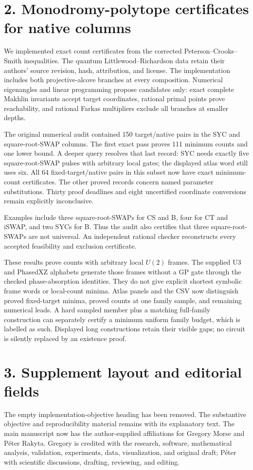 \documentclass[11pt]{article}
\begin{document}
\section*{2. Monodromy-polytope certificates for native columns}
We implemented exact count certificates from the corrected
Peterson--Crooks--Smith inequalities. The quantum Littlewood--Richardson
data retain their authors' source revision, hash, attribution, and license.
The implementation includes both projective-alcove branches at every
composition. Numerical eigenangles and linear programming propose candidates
only: exact complete Makhlin invariants accept target coordinates, rational
primal points prove reachability, and rational Farkas multipliers exclude
all branches at smaller depths.

The original numerical audit contained 150 target/native pairs in the SYC
and square-root-SWAP columns. The first exact pass proves 111 minimum
counts and one lower bound. A deeper query resolves that last record:
SYC needs exactly five square-root-SWAP pulses with arbitrary local gates;
the displayed atlas word still uses six. All 64 fixed-target/native pairs
in this subset now have exact minimum-count certificates. The other proved
records concern named parameter substitutions. Thirty proof deadlines and
eight uncertified coordinate conversions remain explicitly inconclusive.

Examples include three square-root-SWAPs for CS and B, four for CT and
iSWAP, and two SYCs for B. Thus the audit also certifies that three
square-root-SWAPs are not universal. An independent rational checker
reconstructs every accepted feasibility and exclusion certificate.

These results prove counts with arbitrary local $U(2)$ frames. The supplied
U3 and PhasedXZ alphabets generate those frames without a GP gate through
the checked phase-absorption identities. They do not give explicit shortest
symbolic frame words or local-count minima. Atlas panels and the CSV now
distinguish proved fixed-target minima, proved counts at one family sample,
and remaining numerical leads. A hard sampled member plus a matching
full-family construction can separately certify a minimum uniform family
budget, which is labelled as such. Displayed long constructions retain
their visible gaps; no circuit is silently replaced by an existence proof.

\section*{3. Supplement layout and editorial fields}
The empty implementation-objective heading has been removed. The substantive
objective and reproducibility material remains with its explanatory text.
The main manuscript now has the author-supplied affiliations for Gregory
Morse and P\'eter Rakyta. Gregory is credited with the research, software,
mathematical analysis, validation, experiments, data, visualization, and
original draft; P\'eter with scientific discussions, drafting, reviewing,
and editing.
\end{document}
